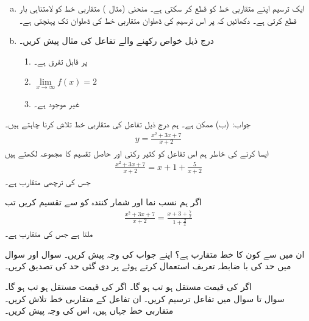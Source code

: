 \begin{enumerate}[a.]
\item

ایک ترسیم اپنے متقاربی خط کو قطع کر سکتی ہے۔ منحنی  (مثال ) متقاربی خط کو لامتناہی بار قطع کرتی ہے۔ دکھائیں کہ  پر اس ترسیم کی ڈھلوان متقاربی خط کی ڈھلوان تک پہنچتی ہے۔ 
\item
درج ذیل خواص رکھنے والے تفاعل  کی مثال پیش کریں۔
\begin{enumerate}[1)]
\item
{} پر  قابل تفرق ہے۔
\item
$\lim\limits_{x\to\infty}f(x)=2$
\item
{} غیر موجود ہے۔
\end{enumerate}
\end{enumerate}
جواب:\quad
(ب)  ممکن ہے۔
ہم درج ذیل تفاعل کی متقاربی خط تلاش کرنا چاہتے ہیں۔
\begin{align*}
y=\frac{x^2+3x+7}{x+2}
\end{align*}
ایسا کرنے کی خاطر ہم اس تفاعل کو کثیر رکنی اور حاصل تقسیم کا مجموعہ لکھتے ہیں
\begin{align*}
\frac{x^2+3x+7}{x+2}=x+1+\frac{5}{x+2}
\end{align*}
جس کی ترچھی متقارب  ہے۔

اگر ہم نسب نما اور شمار کنندہ کو  سے تقسیم کریں تب
\begin{align*}
\frac{x^2+3x+7}{x+2}=\frac{x+3+\tfrac{7}{x}}{1+\tfrac{2}{x}}
\end{align*} 
ملتا ہے جس کی متقارب  ہے۔

ان میں سے کون کا خط متقارب ہے؟ اپنے جواب کی وجہ پیش کریں۔
سوال  اور سوال  میں حد کی با ضابطہ تعریف استعمال کرتے ہوئے  پر دی گئی حد کی تصدیق کریں۔

اگر  کی قیمت مستقل ہو  تب  ہو گا۔
اگر  کی قیمت مستقل ہو  تب  ہو گا۔
\\
سوال  تا سوال  میں تفاعل ترسیم کریں۔ ان تفاعل کے متقاربی خط تلاش کریں۔ متقاربی خط جہاں ہیں، اس کی وجہ پیش کریں۔

